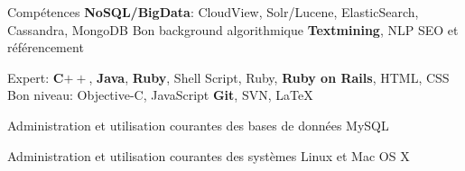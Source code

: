 \begin{rubric}{Compétences}
	 \textbf{NoSQL/BigData}: CloudView, Solr/Lucene, ElasticSearch, Cassandra, MongoDB
	\entry* Bon background algorithmique
	\entry* \textbf{Textmining}, NLP
	\entry* SEO et référencement

	 Expert: \textbf{C$++$}, \textbf{Java}, \textbf{Ruby}, Shell Script, Ruby, \textbf{Ruby on Rails}, HTML, CSS
	\entry* Bon niveau: Objective-C, JavaScript
	\entry* \textbf{Git}, SVN, \LaTeX
	
	 Administration et utilisation courantes des bases de données MySQL
	
	 Administration et utilisation courantes des systèmes Linux et Mac OS X
\end{rubric}
